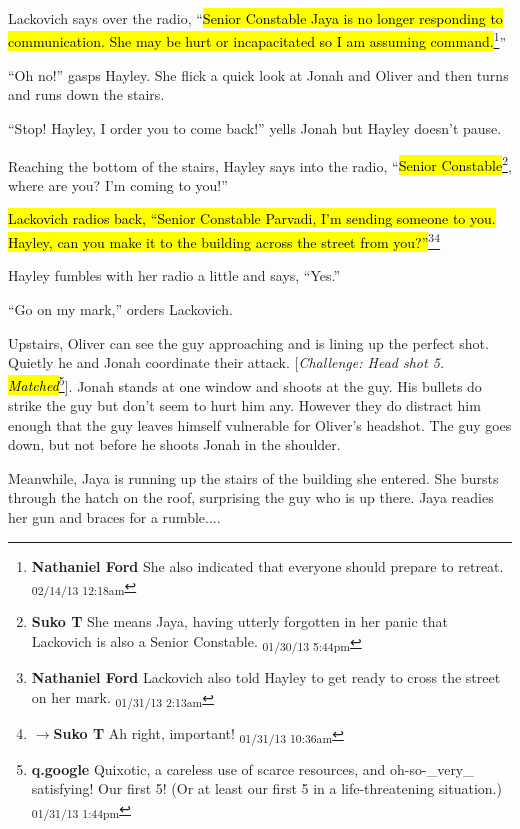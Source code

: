 Lackovich says over the radio, ``\hl{Senior Constable Jaya is no longer responding to communication. She may be hurt or incapacitated so I am assuming command.}\footnote{\textbf{Nathaniel Ford }She also indicated that everyone should prepare to retreat. \textsubscript{02/14/13 12:18am}}''

``Oh no!'' gasps Hayley.  She flick a quick look at Jonah and Oliver and then turns and runs down the stairs.

``Stop!  Hayley, I order you to come back!'' yells Jonah but Hayley doesn't pause.

Reaching the bottom of the stairs, Hayley says into the radio, ``\hl{Senior Constable}\footnote{\textbf{Suko T }She means Jaya, having utterly forgotten in her panic that Lackovich is also a Senior Constable. \textsubscript{01/30/13 5:44pm}}, where are you?  I'm coming to you!''

\hl{Lackovich radios back, ``Senior Constable Parvadi, I'm sending someone to you.  Hayley, can you make it to the building across the street from you?''}\footnote{\textbf{Nathaniel Ford }Lackovich also told Hayley to get ready to cross the street on her mark. \textsubscript{01/31/13 2:13am}}\footnote{$\rightarrow$\textbf{Suko T }Ah right, important! \textsubscript{01/31/13 10:36am}}

Hayley fumbles with her radio a little and says, ``Yes.''

``Go on my mark,'' orders Lackovich.



Upstairs, Oliver can see the guy approaching and is lining up the perfect shot.  Quietly he and Jonah coordinate their attack.  {[}\textit{Challenge: Head shot 5.  }\textit{\hl{Matched}}\footnote{\textbf{q.google }Quixotic, a careless use of scarce resources, and oh-so-\_very\_ satisfying!
Our first 5!  (Or at least our first 5 in a life-threatening situation.) \textsubscript{01/31/13 1:44pm}}{]}.  Jonah stands at one window and shoots at the guy.  His bullets do strike the guy but don't seem to hurt him any.  However they do distract him enough that the guy leaves himself vulnerable for Oliver's headshot.  The guy goes down, but not before he shoots Jonah in the shoulder.



Meanwhile, Jaya is running up the stairs of the building she entered.  She bursts through the hatch on the roof, surprising the guy who is up there.  Jaya readies her gun and braces for a rumble....



